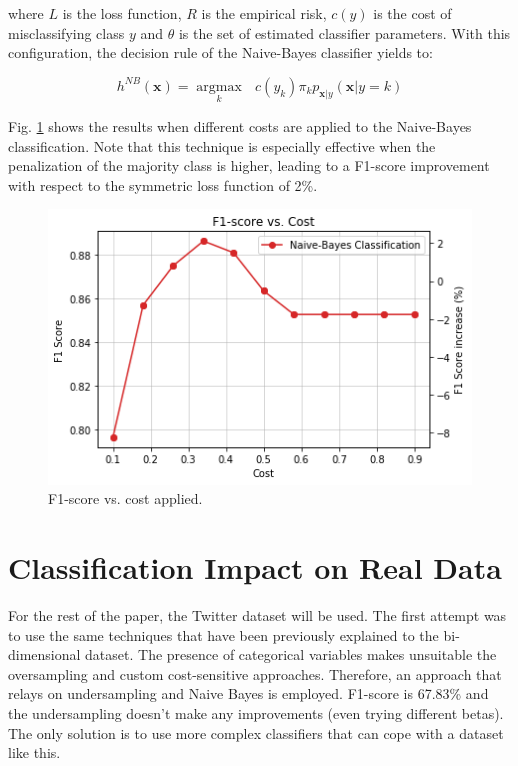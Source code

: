 \documentclass[conference]{IEEEtran}
\begin{document}
	where $L$ is the loss function, $R$ is the empirical risk, $c(y)$ is the cost of misclassifying class $y$ and $\theta$ is the set of estimated classifier parameters. With this configuration, the decision rule of the Naive-Bayes classifier yields to:
	
	$$ h^{NB}(\boldsymbol x) = \underset{k}{\operatorname{argmax}} \text{ } c(y_k) \pi_k p_{\boldsymbol x | y}(\boldsymbol x|y=k)$$
	
	Fig. \ref{fig:CostSensitive} shows the results when different costs are applied to the Naive-Bayes classification. Note that this technique is especially effective when the penalization of the majority class is higher, leading to a F1-score improvement with respect to the symmetric loss function of 2\%. 
	
	\begin{figure}[h]
		\includegraphics[scale=0.45]{pictures/cost-sensitive-dataset1.png}
		\centering
		\caption{F1-score vs. cost applied.}
		\label{fig:CostSensitive}
	\end{figure}

\section{Classification Impact on Real Data}
For the rest of the paper, the Twitter dataset will be used. The first attempt was to use the same techniques that have been previously explained to the bi-dimensional dataset. The presence of categorical variables makes unsuitable the oversampling and custom cost-sensitive approaches. Therefore, an approach that relays on undersampling and Naive Bayes is employed. F1-score is 67.83\% and the undersampling doesn't make any improvements (even trying different betas). The only solution is to use more complex classifiers that can cope with a dataset like this. 
\end{document}

